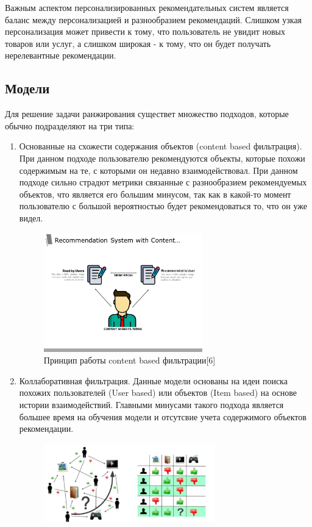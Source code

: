 \documentclass[bachelor, och, coursework]{SCWorks}
\begin{document}
Важным аспектом персонализированных рекомендательных систем является баланс между персонализацией и разнообразием рекомендаций.
Слишком узкая персонализация может привести к тому, что пользователь не увидит новых товаров или услуг, а слишком широкая - к тому,
что он будет получать нерелевантные рекомендации.
\subsection{Модели}
Для решение задачи ранжирования существет множество подходов, которые обычно подразделяют на три типа:

\begin{enumerate}
    \item Основанные на схожести содержания объектов (content based фильтрация). При данном подходе пользователю рекомендуются
    объекты, которые похожи содержимым на те, с которыми он недавно взаимодействовал. При данном подходе сильно страдют
    метрики связанные с разнообразием рекомендуемых объектов, что является его большим минусом, так как в какой-то
    момент пользователю с большой вероятностью будет рекомендоваться то, что он уже видел.
    \begin{figure}[H]
        \centering
        \includegraphics[width=0.65\textwidth]{pic/2}
        \caption{Принцип работы content based фильтрации[6]}
        \label{fig:img1}
    \end{figure}
    \item Коллаборативная фильтрация. Данные модели основаны на идеи поиска похожих пользователей (User based) или объектов (Item based)
    на основе истории взаимодействий. Главными минусами такого подхода является большее время на обучения модели и отсутсвие учета содержимого объектов рекомендации.
    \begin{figure}[H]
        \centering
        \includegraphics[width=0.7\textwidth]{pic/1}

\end{figure}
\end{enumerate}
\end{document}

